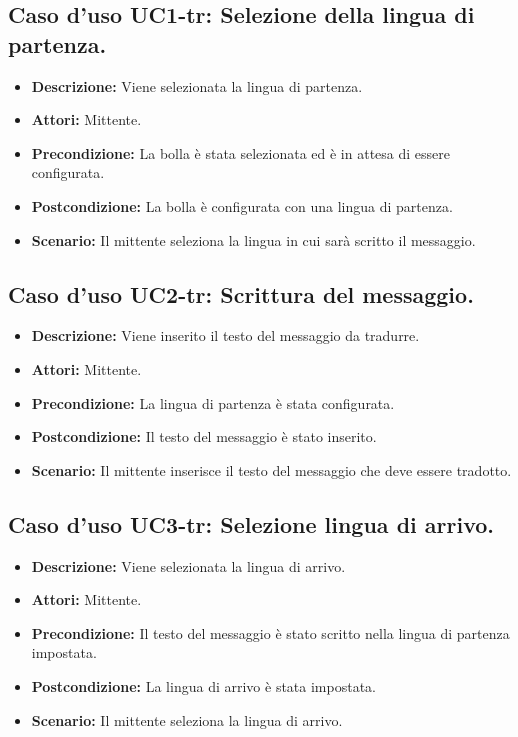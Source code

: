 \subsection{Caso d'uso UC1-tr: Selezione della lingua di partenza.}
\begin{itemize}
\item[]\textbf{Descrizione:} Viene selezionata la lingua di partenza.
\item[]\textbf{Attori:} Mittente. 
\item[]\textbf{Precondizione:} La bolla è stata selezionata ed è in attesa di essere configurata. 
\item[]\textbf{Postcondizione:} La bolla è configurata con una lingua di partenza. 
\item[]\textbf{Scenario:}
Il mittente seleziona la lingua in cui sarà scritto il messaggio. 
\end{itemize}

\subsection{Caso d'uso UC2-tr: Scrittura del messaggio.}
\begin{itemize}
\item[]\textbf{Descrizione:} Viene inserito il testo del messaggio da tradurre.
\item[]\textbf{Attori:} Mittente. 
\item[]\textbf{Precondizione:} La lingua di partenza è stata configurata. 
\item[]\textbf{Postcondizione:} Il testo del messaggio è stato inserito. 
\item[]\textbf{Scenario:}
Il mittente inserisce il testo del messaggio che deve essere tradotto. 
\end{itemize}

\subsection{Caso d'uso UC3-tr: Selezione lingua di arrivo.}
\begin{itemize}
\item[]\textbf{Descrizione:} Viene selezionata la lingua di arrivo.
\item[]\textbf{Attori:} Mittente. 
\item[]\textbf{Precondizione:} Il testo del messaggio è stato scritto nella lingua di partenza impostata. 
\item[]\textbf{Postcondizione:} La lingua di arrivo è stata impostata. 
\item[]\textbf{Scenario:}
Il mittente seleziona la lingua di arrivo. 
\end{itemize}

